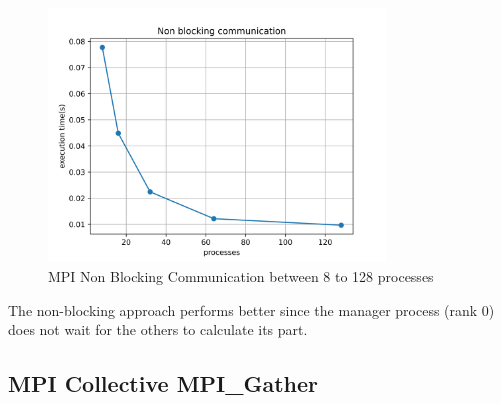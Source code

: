 \documentclass[12pt]{article}
\begin{document}
\begin{enumerate}
\begin{enumerate}
\begin{figure}[H]
  \centering
  \includegraphics[width=0.8\textwidth]{graph-pi-non-blocking.png}
  \caption{MPI Non Blocking Communication between 8 to 128 processes}
  \label{fig:blocking}
\end{figure}

The non-blocking approach performs better since the manager process (rank 0) does not wait for the others to calculate its part.

  \end{enumerate}
	
\end{enumerate}


\subsection{MPI Collective MPI\_Gather}
\end{document}
